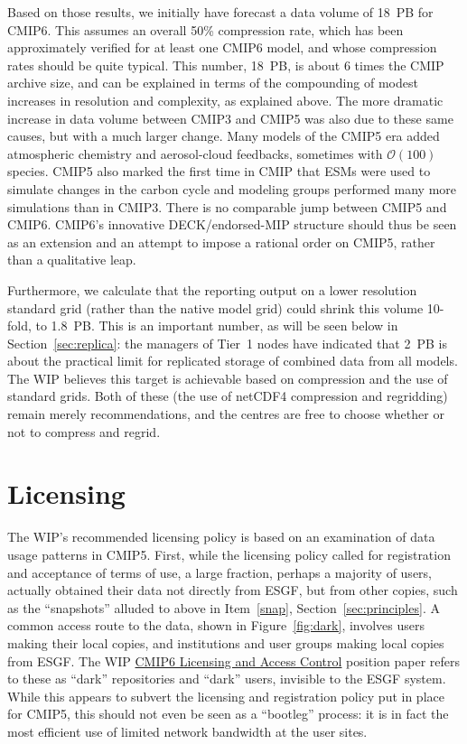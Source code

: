 \documentclass[gmd,manuscript]{copernicus}
\newcommand{\figref}[1] {\mbox{Figure   \ref{fig:#1}}}
\newcommand{\secref}[1] {\mbox{Section  \ref{sec:#1}}}
\begin{document}
Based on those results, we initially have forecast a data volume of
18~PB for CMIP6. This assumes an overall 50\% compression rate, which
has been approximately verified for at least one CMIP6 model, and
whose compression rates should be quite typical. This number, 18~PB,
is about 6 times the CMIP archive size, and can be explained in terms
of the compounding of modest increases in resolution and complexity,
as explained above. The more dramatic increase in data volume between
CMIP3 and CMIP5 was also due to these same causes, but with a much
larger change. Many models of the CMIP5 era added atmospheric chemistry
and aerosol-cloud feedbacks, sometimes with $\mathcal{O}(100)$
species. CMIP5 also marked the first time in CMIP that ESMs were used to
simulate changes in the carbon cycle and modeling groups performed
many more simulations than in CMIP3. There is no
comparable jump between CMIP5 and CMIP6. CMIP6's innovative
DECK/endorsed-MIP structure should thus be seen as an extension and an
attempt to impose a rational order on CMIP5, rather than a qualitative
leap.

Furthermore, we calculate that the reporting output on a lower
resolution standard grid (rather than the native model grid) could
shrink this volume 10-fold, to 1.8~PB. This is an important number, as
will be seen below in \secref{replica}: the managers of Tier~1 nodes
have indicated that 2~PB is about the practical limit for replicated
storage of combined data from all models. The WIP believes
this target is achievable based on compression and the use of standard
grids. Both of these (the use of netCDF4 compression and regridding)
remain merely recommendations, and the centres are free to choose
whether or not to compress and regrid.

\section{Licensing}
\label{sec:licensing}

The WIP's recommended licensing policy is based on an examination of
data usage patterns in CMIP5. First, while the licensing policy called
for registration and acceptance of terms of use, a large fraction,
perhaps a majority of users, actually obtained their data not directly
from ESGF, but from other copies, such as the ``snapshots'' alluded to
above in Item~\ref{snap}, \secref{principles}. 
A common access route to the data, shown in \figref{dark}, involves
users making their local copies, and institutions and user groups
making local copies from ESGF. The WIP
\href{https://goo.gl/h4HSP1}{CMIP6 Licensing and Access Control}
position paper refers to these as ``dark'' repositories and ``dark''
users, invisible to the ESGF system. While this appears to subvert the
licensing and registration policy put in place for CMIP5, this should
not even be seen as a ``bootleg'' process: it is in fact the most
efficient use of limited network bandwidth at the user sites.
\end{document}
